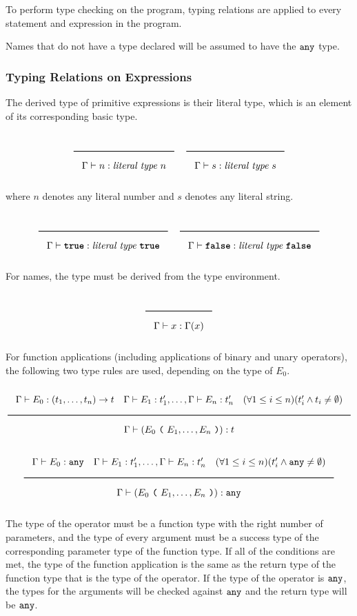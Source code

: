 To perform type checking on the program, typing relations are applied to every statement and expression in the program.

Names that do not have a type declared will be assumed to have the $\texttt{any}$ type.

\subsubsection{Typing Relations on Expressions}

The derived type of primitive expressions is their literal type, which is an element of its corresponding basic type.

\noindent
\[
  \Rule{}{\Gamma \vdash n : \textit{literal type}\ n}
  \quad
  \Rule{}{\Gamma \vdash s : \textit{literal type}\ s}
\]
\noindent

where $n$ denotes any literal number and $s$ denotes any literal string.

\noindent
\[
  \Rule{}{\Gamma \vdash \TruE : \textit{literal type}\ \TruE}
  \quad
  \Rule{}{\Gamma \vdash \FalsE : \textit{literal type}\ \FalsE}
\]
\noindent

For names, the type must be derived from the type environment.

\noindent
\[
  \Rule{}{\Gamma \vdash x : \Gamma(x)}
\]
\noindent

For function applications (including applications of binary and unary operators), the following two type rules are used, depending on the type of $E_0$.

\noindent
\[
\Rule{\Gamma \vdash E_0 : (t_1, \ldots, t_n) \rightarrow t \quad \Gamma \vdash E_1 : t'_1, \ldots,  \Gamma \vdash E_n : t'_n
  \quad (\forall 1 \leq i \leq n)(t'_i \wedge t_i \neq \emptyset)}{\Gamma \vdash (E_0\ \Lp \ E_1, \ldots, E_n\ \Rp) : t}
\]
\noindent
\[
  \Rule{\Gamma \vdash E_0 : \Any \quad \Gamma \vdash E_1 : t'_1, \ldots,  \Gamma \vdash E_n : t'_n
  \quad (\forall 1 \leq i \leq n)(t'_i \wedge \Any \neq \emptyset)}{\Gamma \vdash (E_0\ \Lp \ E_1, \ldots, E_n\ \Rp) : \Any}
\]
\noindent

The type of the operator must be a function type with the right number of parameters,
and the type of every argument must be a success type of the corresponding parameter type of the function type.
If all of the conditions are met, the type of the function application is the same
as the return type of the function type that is the type of the operator.
If the type of the operator is $\texttt{any}$, the types for the arguments will be checked against $\texttt{any}$ and the return type will be $\texttt{any}$.

